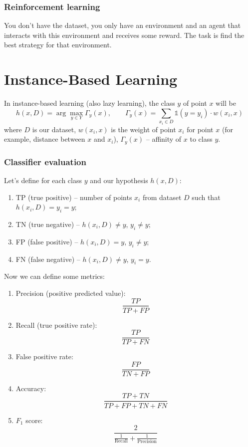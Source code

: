 \subsubsection*{Reinforcement learning}

You don't have the dataset, you only have an environment and an agent that interacts with this environment and receives some reward. The task is find the best strategy for that environment.

\section{Instance-Based Learning}

In instance-based learning (also lazy learning), the class $y$ of point $x$ will be
$$h(x, D)=\arg\max\limits_{y\in Y}\Gamma_y(x), \qquad \Gamma_y(x)=\sum\limits_{x_i\in D}\mathbb{1}(y=y_i)\cdot w(x_i,x)$$
where $D$ is our dataset, $w(x_i,x)$ is the weight of point $x_i$ for point $x$ (for example, distance between $x$ and $x_i$), $\Gamma_y(x)$ -- affinity of $x$ to class $y$.

\subsubsection*{Classifier evaluation}

Let's define for each class $y$ and our hypothesis $h(x, D)$:
\begin{enumerate}[label=$\bullet$]
	\item TP (true positive) -- number of points $x_i$ from dataset $D$ such that $h(x_i, D)=y_i=y$;
	\item TN (true negative) -- $h(x_i, D)\ne y$, $y_i\ne y$;
	\item FP (false positive) -- $h(x_i, D)=y$, $y_i\ne y$;
	\item FN (false negative) -- $h(x_i, D)\ne y$, $y_i=y$.
\end{enumerate}
Now we can define some metrics:
\begin{enumerate}[label=$\bullet$]
	\item Precision (positive predicted value): $$\frac{TP}{TP + FP}$$
	\item Recall (true positive rate): $$\frac{TP}{TP+FN}$$
	\item False positive rate: $$\frac{FP}{TN+FP}$$
	\item Accuracy: $$\frac{TP+TN}{TP+FP+TN+FN}$$
	\item $F_1$ score: $$\frac{2}{\frac{1}{\text{Recall}}+\frac{1}{\text{Precision}}}$$
\end{enumerate}

